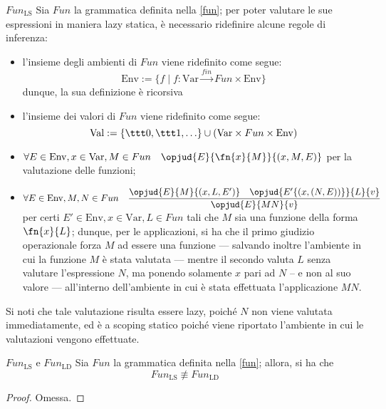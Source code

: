 \documentclass[a4paper, 12pt]{report}
\begin{document}
    \begin{framedprop}{$Fun_\mathrm{LS}$}
        Sia $Fun$ la grammatica definita nella \cref{fun}; per poter valutare le sue espressioni in maniera lazy statica, è necessario ridefinire alcune regole di inferenza:

        \begin{itemize}
            \item l'insieme degli ambienti di $Fun$ viene ridefinito come segue: $$\mathrm{Env} := \{f \mid f :\mathrm{Var} \xrightarrow{fin} Fun \times \mathrm{Env}\}$$ dunque, la sua definizione è ricorsiva
            \item l'insieme dei valori di $Fun$ viene ridefinito come segue: $$\mathrm{Val} := \{\ttt 0, \ttt 1, \ldots\} \cup (\mathrm{Var} \times Fun \times \mathrm{Env})$$
            \item $\forall E \in \mathrm{Env}, x \in \mathrm{Var}, M \in Fun \quad \opjud{E}{\fn{x}{M}}{(x,M,E)}$ per la valutazione delle funzioni;
            \item $\forall E \in \mathrm{Env}, M,N \in Fun \quad \dfrac{\opjud{E}{M}{(x,L,E')} \quad \opjud{E'\{(x,(N,E))\}}{L}{v}}{\opjud{E}{MN}{v}}$ per certi $E' \in \mathrm{Env}, x \in \mathrm{Var}, L \in Fun$ tali che $M$ sia una funzione della forma $\fn{x}{L}$; dunque, per le applicazioni, si ha che il primo giudizio operazionale forza $M$ ad essere una funzione --- salvando inoltre l'ambiente in cui la funzione $M$ è stata valutata --- mentre il secondo valuta $L$ senza valutare l'espressione $N$, ma ponendo solamente $x$ pari ad $N$ -- e non al suo valore --- all'interno dell'ambiente in cui è stata effettuata l'applicazione $MN$.
        \end{itemize}

        Si noti che tale valutazione risulta essere lazy, poiché $N$ non viene valutata immediatamente, ed è a scoping statico poiché viene riportato l'ambiente in cui le valutazioni vengono effettuate.
    \end{framedprop}

    \begin{framedlem}[label={fun lemma pt2}]{$Fun_\mathrm{LS}$ e $Fun_\mathrm{LD}$}
        Sia $Fun$ la grammatica definita nella \cref{fun}; allora, si ha che $$Fun_\mathrm{LS} \not\equiv Fun_\mathrm{LD}$$
    \end{framedlem}

    \begin{proof}
        Omessa.
    \end{proof}
\end{document}
